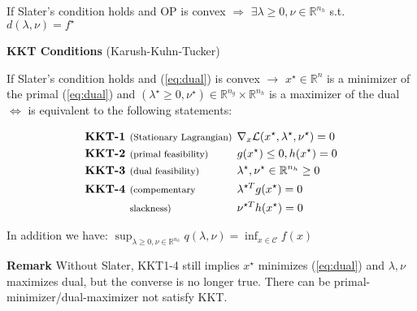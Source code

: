\begin{proposition}
	If Slater's condition holds
	and OP is convex
	$\Rightarrow$
	$\exists \lambda \ge 0, \nu \in \mathbb{R}^{n_h}$ s.t. $d(\lambda,\nu)=f^\star$
\end{proposition}

\begin{sstTitleBox}[BrickRed]{\textbf{\large
			KKT  Conditions}
		\normalsize(Karush-Kuhn-Tucker)}
	\begin{theorem}
		\begin{centering}
			If Slater's condition holds and
			(\ref{eq:dual}) is convex
			$\rightarrow$
			$x^\star \in \mathbb{R}^{n}$ is a minimizer of the primal (\ref{eq:dual})
			and $(\lambda^\star\ge0,\nu^\star)\in\mathbb{R}^{n_g}\times\mathbb{R}^{n_h}$
			is a maximizer of the dual $\Leftrightarrow$
			is equivalent to the following statements:
			\begin{sstFrame}[BrickRed]
				\vspace{-3mm}
				\color{white}
				\small
				\[\begin{aligned}
						\textbf{KKT-1 } & \text{\footnotesize (Stationary Lagrangian)} \hspace{-2mm} &  & \nabla_x\mathcal{L}(x^\star,\lambda^\star,\nu^\star)  =  0
						\\
						\textbf{KKT-2 } & \text{\footnotesize (primal feasibility)}                  &  & g(x^\star)\le0, h(x^\star)                            =                            0
						\\
						\textbf{KKT-3 } & \text{\footnotesize (dual feasibility)}                    &  & \lambda^\star  , \nu^\star \in \mathbb{R}^{n_h}       \ge       0
						\\
						\textbf{KKT-4 } & \text{\footnotesize (compementary}                         &  & \lambda^{\star T} g(x^\star)                          =                          0
						\\
						                & \text{\footnotesize slackness)}                            &  & \nu^{\star T} h(x^\star)                              =  0
					\end{aligned}\]
				\vspace{-4mm}
			\end{sstFrame}
			In addition we have:
			$\sup_{\lambda\ge0,\nu\in\mathbb{R}^{n_h}}q(\lambda,\nu)=\inf_{x\in\mathcal{C}}f(x)$
		\end{centering}
	\end{theorem}
\end{sstTitleBox}

\textbf{Remark} Without Slater,
KKT1-4 still implies $x^\star$ minimizes (\ref{eq:dual})
and $\lambda,\nu$ maximizes dual,
but the converse is no longer true.
There can be primal-minimizer/dual-maximizer not satisfy KKT.


